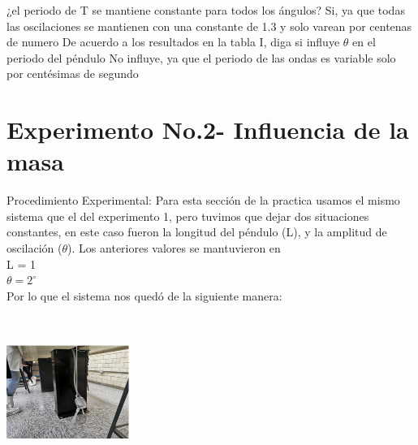 \documentclass[10pt]{article}
\begin{document}
\begin{multicols}{2}
\begin{center}
\begin{adjustbox}{width=245pt}
\begin{tabular}{|c|c|c|c|c|c|c|c|c|c|c|c|}
		\end{tabular}
	\end{adjustbox}
\end{center}



	¿el periodo de T se mantiene constante para todos los ángulos? 
	Si, ya que todas las oscilaciones se mantienen con una constante de 1.3 y solo varean por centenas de numero 
	De acuerdo a los resultados en la tabla I, diga si influye $\theta$ en el periodo del péndulo 
	No influye, ya que el periodo de las ondas es variable solo por centésimas de segundo
\section{Experimento No.2- Influencia de la masa}
Procedimiento Experimental:
Para esta sección de la practica usamos el mismo sistema que el del experimento 1, pero tuvimos que dejar dos situaciones constantes, en este caso fueron la longitud del péndulo (L), y la amplitud de oscilación ($\theta$). Los anteriores valores se mantuvieron en \\
L = 1 \\
$\theta = 2^{\circ}$ \\

Por lo que el sistema nos quedó de la siguiente manera: \\
\begin{center}
	\includegraphics[width=4cm,height=5cm]{Imagenes/Masal.png}
	\label{fig:1}
\end{center}


\end{multicols}
\end{document}

